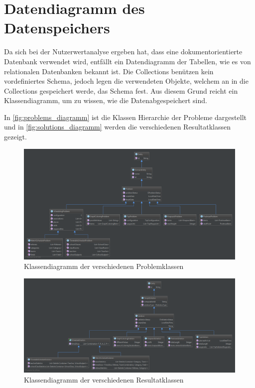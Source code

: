 \section{Datendiagramm des Datenspeichers}\label{datendiagramm_datenspeicher}
Da sich bei der Nutzerwertanalyse ergeben hat, dass eine dokumentorientierte Datenbank verwendet wird, entfällt ein Datendiagramm der Tabellen, wie es von relationalen Datenbanken 
bekannt ist. Die Collections benützen kein vordefiniertes Schema, jedoch legen die verwendeten Objekte, welchem an in die Collections gespeichert werde, das Schema fest. Aus diesem Grund 
reicht ein Klassendiagramm, um zu wissen, wie die Datenabgespeichert sind.

In \autoref{fig:problems_diagramm} ist die Klassen Hierarchie der Probleme dargestellt und in \autoref{fig:solutions_diagramm} werden die verschiedenen 
Resultatklassen gezeigt.

\begin{landscape}

\begin{figure}[h]
\centering
\includegraphics[scale=0.5]{images/problems_diagramm.png}
\caption[Klassendiagramm der verschiedenen Problemklassen]{Klassendiagramm der verschiedenen Problemklassen \selfmade{}}
\label{fig:problems_diagramm}
\end{figure}

\begin{figure}[h]
\centering
\includegraphics[scale=0.45]{images/solutions_diagramm.png}
\caption[Klassendiagramm der verschiedenen Resultatklassen]{Klassendiagramm der verschiedenen Resultatklassen \selfmade{}}
\label{fig:solutions_diagramm}
\end{figure}

\end{landscape}
